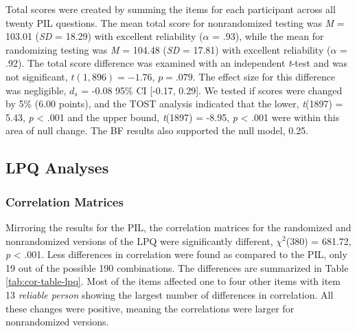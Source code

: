 \documentclass[english,man]{apa6}
\theoremstyle{definition}
\theoremstyle{definition}
\theoremstyle{definition}
\theoremstyle{remark}
\begin{document}
Total scores were created by summing the items for each participant
across all twenty PIL questions. The mean total score for nonrandomized
testing was \emph{M} = 103.01 (\emph{SD} = 18.29) with excellent
reliability (\(\alpha\) = .93), while the mean for randomizing testing
was \emph{M} = 104.48 (\emph{SD} = 17.81) with excellent reliability
(\(\alpha\) = .92). The total score difference was examined with an
independent \emph{t}-test and was not significant, \(t(1,896) = -1.76\),
\(p = .079\). The effect size for this difference was negligible,
\(d_{s}\) = -0.08 95\% CI {[}-0.17, 0.29{]}. We tested if scores were
changed by 5\% (6.00 points), and the TOST analysis indicated that the
lower, \emph{t}(1897) = 5.43, \emph{p} \textless{} .001 and the upper
bound, \emph{t}(1897) = -8.95, \emph{p} \textless{} .001 were within
this area of null change. The BF results also supported the null model,
0.25.

\subsection{LPQ Analyses}\label{lpq-analyses}

\subsubsection{Correlation Matrices}\label{correlation-matrices-1}

Mirroring the results for the PIL, the correlation matrices for the
randomized and nonrandomized versions of the LPQ were significantly
different, \(\chi^2\)(380) = 681.72, \emph{p} \textless{} .001. Less
differences in correlation were found as compared to the PIL, only 19
out of the possible 190 combinations. The differences are summarized in
Table \ref{tab:cor-table-lpq}. Most of the items affected one to four
other items with item 13 \emph{reliable person} showing the largest
number of differences in correlation. All these changes were positive,
meaning the correlations were larger for nonrandomized versions.
\end{document}
